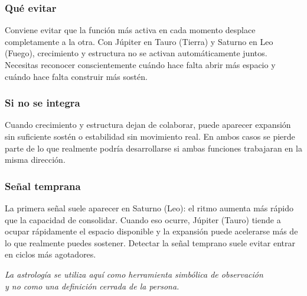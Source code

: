 \documentclass[11pt,a4paper]{article}
\begin{document}
\subsubsection*{Qué evitar}

Conviene evitar que la función más activa en cada momento desplace completamente a la otra. Con Júpiter en Tauro (Tierra) y Saturno en Leo (Fuego), crecimiento y estructura no se activan automáticamente juntos. Necesitas reconocer conscientemente cuándo hace falta abrir más espacio y cuándo hace falta construir más sostén.

\subsubsection*{Si no se integra}

Cuando crecimiento y estructura dejan de colaborar, puede aparecer expansión sin suficiente sostén o estabilidad sin movimiento real. En ambos casos se pierde parte de lo que realmente podría desarrollarse si ambas funciones trabajaran en la misma dirección.

\subsubsection*{Señal temprana}

La primera señal suele aparecer en Saturno (Leo): el ritmo aumenta más rápido que la capacidad de consolidar. Cuando eso ocurre, Júpiter (Tauro) tiende a ocupar rápidamente el espacio disponible y la expansión puede acelerarse más de lo que realmente puedes sostener. Detectar la señal temprano suele evitar entrar en ciclos más agotadores.

\vfill

\begin{center}
{\small\itshape\color{grisai}
La astrología se utiliza aquí como herramienta simbólica de observación\\
y no como una definición cerrada de la persona.
}
\end{center}
\end{document}
